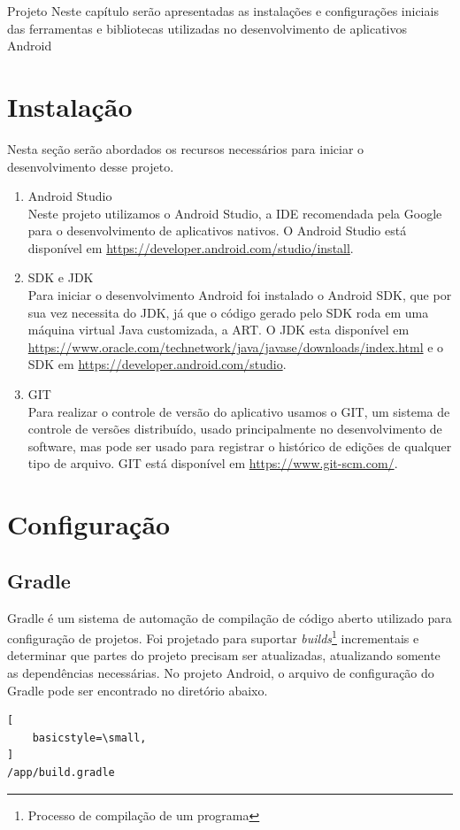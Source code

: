 \documentclass[
	12pt,				%
	openany,			%
	twoside,			%
	a4paper,			%
	english,			%
	french,				%
	spanish,			%
	brazil				%
	]{abntex2}
\begin{document}
\begin{chapter}{Projeto}
Neste capítulo serão apresentadas as instalações e configurações iniciais das ferramentas e bibliotecas utilizadas no desenvolvimento de aplicativos Android
\section{Instalação} Nesta seção serão abordados os recursos necessários para iniciar o desenvolvimento desse projeto.
\begin{enumerate}
  \item{Android Studio} \\
  Neste projeto utilizamos o Android Studio, a IDE recomendada pela Google para o desenvolvimento de aplicativos nativos. O Android Studio está disponível em \url{https://developer.android.com/studio/install}.
  \item{SDK e JDK} \\ Para iniciar o desenvolvimento Android foi instalado o Android SDK, que por sua vez necessita do JDK, já que o código gerado pelo SDK roda em uma máquina virtual Java customizada, a ART.
  O JDK esta disponível em \url{https://www.oracle.com/technetwork/java/javase/downloads/index.html} e o SDK em \url{https://developer.android.com/studio}.
  \item{GIT} \\
  Para realizar o controle de versão do aplicativo usamos o GIT, um sistema de controle de versões distribuído, usado principalmente no desenvolvimento de software, mas pode ser usado para registrar o histórico de edições de qualquer tipo de arquivo. 
  GIT está disponível em \url{https://www.git-scm.com/}.
  
\end{enumerate}



\section{Configuração}
\subsection{Gradle}
Gradle é um sistema de automação de compilação de código aberto utilizado para configuração de projetos. Foi projetado para suportar \textit{builds}\footnote{Processo de compilação de um programa} incrementais e determinar que partes do projeto precisam ser atualizadas, atualizando somente as dependências necessárias.
No projeto Android, o arquivo de configuração do Gradle pode ser encontrado no diretório abaixo. \begin{lstlisting}[
    basicstyle=\small,
]
/app/build.gradle
\end{lstlisting}

\end{chapter}
\end{document}
